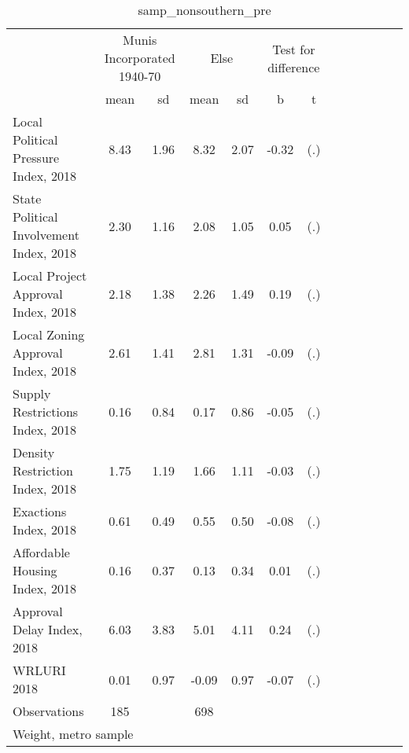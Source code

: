 \begin{table}[htbp]\centering
\def\sym#1{\ifmmode^{#1}\else\(^{#1}\)\fi}
\caption{samp\_nonsouthern\_pre \label{tab1}}
\begin{tabular}{l*{3}{cccc}}
\toprule
                    &\multicolumn{2}{c}{Munis Incorporated 1940-70}&\multicolumn{2}{c}{Else} &\multicolumn{2}{c}{Test for difference}\\
                    &        mean&          sd&        mean&          sd&           b         &           t\\
\midrule
Local Political Pressure Index, 2018&        8.43&        1.96&        8.32&        2.07&       -0.32         &         (.)\\
State Political Involvement Index, 2018&        2.30&        1.16&        2.08&        1.05&        0.05         &         (.)\\
Local Project Approval Index, 2018&        2.18&        1.38&        2.26&        1.49&        0.19         &         (.)\\
Local Zoning Approval Index, 2018&        2.61&        1.41&        2.81&        1.31&       -0.09         &         (.)\\
Supply Restrictions Index, 2018&        0.16&        0.84&        0.17&        0.86&       -0.05         &         (.)\\
Density Restriction Index, 2018&        1.75&        1.19&        1.66&        1.11&       -0.03         &         (.)\\
Exactions Index, 2018&        0.61&        0.49&        0.55&        0.50&       -0.08         &         (.)\\
Affordable Housing Index, 2018&        0.16&        0.37&        0.13&        0.34&        0.01         &         (.)\\
Approval Delay Index, 2018&        6.03&        3.83&        5.01&        4.11&        0.24         &         (.)\\
WRLURI 2018         &        0.01&        0.97&       -0.09&        0.97&       -0.07         &         (.)\\
\midrule
Observations        &         185&            &         698&            &                     &            \\
\bottomrule
\multicolumn{7}{l}{\footnotesize Weight, metro sample}\\
\end{tabular}
\end{table}
